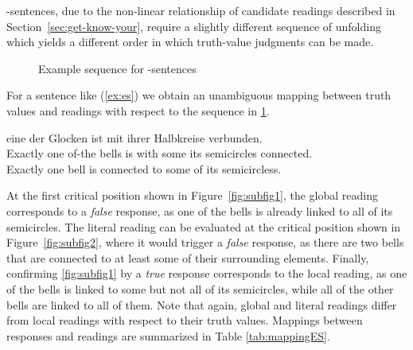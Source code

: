 \documentclass[fleqn,reqno,10pt,draft]{article}
\renewcommand{\es}{\acro{es}}
\begin{document}
\es-sentences, due to the non-linear relationship of candidate
readings described in Section~\ref{sec:get-know-your}, require a
slightly different sequence of unfolding which yields a different
order in which truth-value judgments can be made.
%
\begin{figure}[ht]
	\centering
	\caption[]{Example sequence for \es-sentences}
	\label{fig:exseqES}
\end{figure}
%
For a sentence like (\ref{ex:es}) we obtain an unambiguous
mapping between truth values and readings with respect to the sequence
in \ref{fig:exseqES}.
\begin{exe}
\ex \label{ex:es} \gll {} eine der Glocken ist mit
   ihrer Halbkreise verbunden.\\ 
  Exactly one of-the bells is with some its semicircles connected.\\
  \trans Exactly one bell is connected to some of its semicircless.
\end{exe}
At the first critical position shown in Figure~\ref{fig:subfig1}, the
global reading corresponds to a \emph{false} response, as one of the
bells is already linked to all of its semicircles. The literal reading
can be evaluated at the critical position shown in
Figure~\ref{fig:subfig2}, where it would trigger a \emph{false}
response, as there are two bells that are connected to at least some
of their surrounding elements. Finally, confirming \ref{fig:subfig1}
by a \emph{true} response corresponds to the local reading, as one of
the bells is linked to some but not all of its semicircles, while all
of the other bells are linked to all of them. Note that again, global
and literal readings differ from local readings with respect to their
truth values. Mappings between responses and readings are summarized
in Table \ref{tab:mappingES}.
\end{document}
